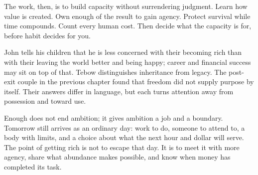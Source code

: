 The work, then, is to build capacity without surrendering judgment. Learn how
value is created. Own enough of the result to gain agency. Protect survival
while time compounds. Count every human cost. Then decide what the capacity
is for, before habit decides for you.

John tells his children that he is less concerned with their becoming rich
than with their leaving the world better and being happy; career and financial
success may sit on top of that. Tebow distinguishes inheritance from legacy.
The post-exit couple in the previous chapter found that freedom did not supply
purpose by itself. Their answers differ in language, but each turns attention
away from possession and toward use.

Enough does not end ambition; it gives ambition a job and a boundary. Tomorrow
still arrives as an ordinary day: work to do,
someone to attend to, a body with limits, and a choice about what the next hour
and dollar will serve. The point of getting rich is not to escape that day. It
is to meet it with more agency, share what abundance makes possible, and know
when money has completed its task.
